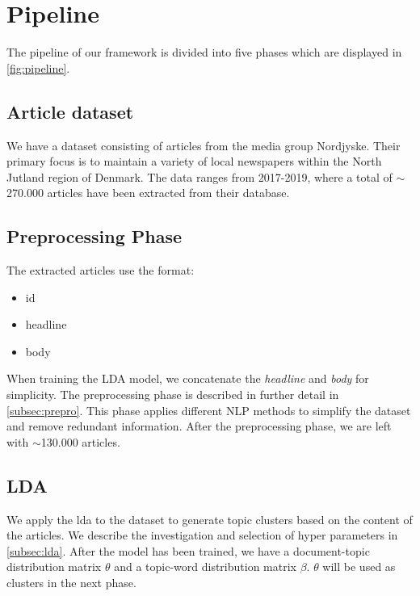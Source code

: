 \section{Pipeline}


The pipeline of our framework is divided into five phases which are displayed in \autoref{fig:pipeline}. 

\subsection{Article dataset}
We have a dataset consisting of articles from the media group Nordjyske. Their primary focus is to maintain a variety of local newspapers within the North Jutland region of Denmark. 
The data ranges from 2017-2019, where a total of $\sim$270.000 articles have been extracted from their database.

\subsection{Preprocessing Phase}
The extracted articles use the format:
\begin{itemize}
	\item id
	\item headline
	\item body
\end{itemize}
When training the LDA model, we concatenate the \emph{headline} and \emph{body} for simplicity. 
The preprocessing phase is described in further detail in \autoref{subsec:prepro}.
This phase applies different \gls{NLP} methods  to simplify the dataset and remove redundant information.
After the preprocessing phase, we are left with $\sim$130.000 articles.

\subsection{LDA}
We apply the \acrfull{lda} to the dataset to generate topic clusters based on the content of the articles. 
We describe the investigation and selection of hyper parameters in \autoref{subsec:lda}. 
After the model has been trained, we have a document-topic distribution matrix $\theta$ and a topic-word distribution matrix $\beta$.
$\theta$ will be used as clusters in the next phase.

